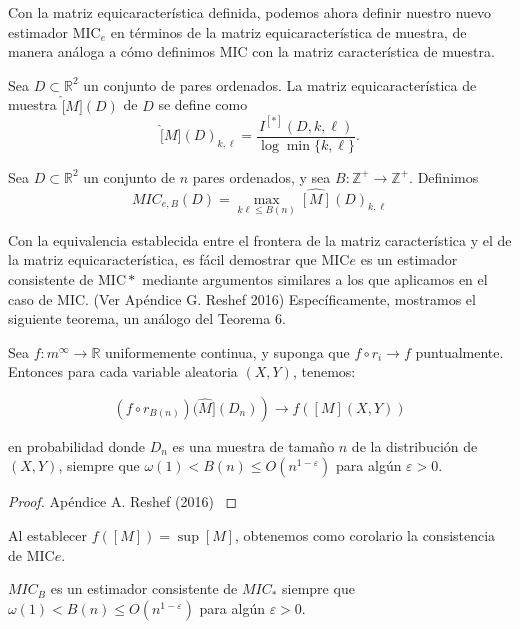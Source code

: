 	Con la matriz equicaracter\'istica definida, podemos ahora definir nuestro nuevo estimador $\mathrm{MIC}_e$ en t\'erminos de la matriz equicaracter\'istica de muestra, de manera an\'aloga a c\'omo definimos MIC con la matriz caracter\'istica de muestra.

	\begin{defn}
		Sea $D \subset \mathbb{R}^2$ un conjunto de pares ordenados. La matriz equicaracter\'istica de muestra $\widehat[{M}](D)$ de $D$ se define como
		$$
		\widehat[{M}](D)_{k, \ell}=\frac{I^{[*]}(D, k, \ell)}{\log \min \{k, \ell\}} .
		$$
	\end{defn}
	\begin{defn}
		Sea $D \subset \mathbb{R}^2$ un conjunto de $n$ pares ordenados, y sea $B: \mathbb{Z}^{+} \rightarrow \mathbb{Z}^{+}$. Definimos
		$$
		M I C_{e, B}(D)=\max _{k \ell \leq B(n)} \widehat{[M]}(D)_{k, \ell}
		$$
	\end{defn}


	Con la equivalencia establecida entre el frontera de la matriz caracter\'istica y el de la matriz equicaracter\'istica, es f\'acil demostrar que $\mathrm{MIC}e$ es un estimador consistente de $\mathrm{MIC}*$ mediante argumentos similares a los que aplicamos en el caso de MIC. (Ver Ap\'endice G. Reshef 2016) Espec\'ificamente, mostramos el siguiente teorema, un an\'alogo del Teorema 6.
	
	\begin{thm}
		Sea $f: m^{\infty} \rightarrow \mathbb{R}$ uniformemente continua, y suponga que $f \circ r_i \rightarrow f$ puntualmente. Entonces para cada variable aleatoria $(X, Y)$, tenemos:

		$$
		\left.\left(f \circ r_{B(n)}\right)(\widehat{M}]\left(D_n\right)\right) \rightarrow f([M](X, Y))
		$$

		en probabilidad donde $D_n$ es una muestra de tama\~no $n$ de la distribuci\'on de $(X, Y)$, siempre que $\omega(1)<B(n) \leq O\left(n^{1-\varepsilon}\right)$ para alg\'un $\varepsilon>0$.
	\end{thm}
	\begin{proof}
		Ap\'endice A. Reshef (2016) \cite{Reshef2016}
	\end{proof}

	Al establecer $f([M])=\sup [M]$, obtenemos como corolario la consistencia de $\mathrm{MIC}e$.
	
	\begin{cor}
		$M I C_{B}$ es un estimador consistente de $M I C_*$ siempre que $\omega(1)<B(n) \leq O\left(n^{1-\varepsilon}\right)$ para alg\'un $\varepsilon>0$.
	\end{cor}

